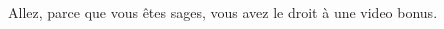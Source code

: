 \begin{multicols}{2}


Allez, parce que vous êtes sages, vous avez le droit à une video bonus.

\end{multicols}


